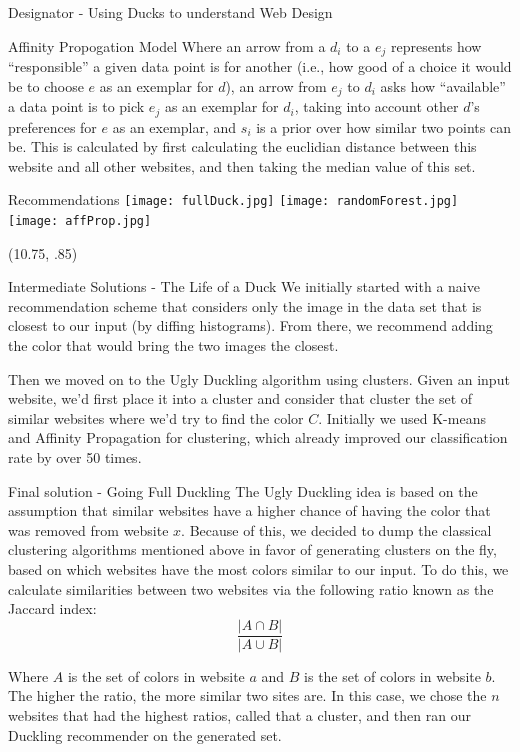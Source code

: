 \documentclass{beamer}
\begin{document}
\begin{frame}{\centerline{\Huge Designator - Using Ducks to understand Web Design}}
\begin{textblock}{5}
\begin{block}{Affinity Propogation Model}
Where an arrow from a $d_i$ to a $e_j$ represents how ``responsible'' a given data point is for another (i.e., how good of a choice it would be to choose $e$ as an exemplar for $d$), an arrow from $e_j$ to $d_i$ asks how ``available'' a data point is to pick $e_j$ as an exemplar for $d_i$, taking into account other $d$'s preferences for $e$ as an exemplar, and $s_i$ is a prior over how similar two points can be. This is calculated by first calculating the euclidian distance between this website and all other websites, and then taking the median value of this set.
\end{block}
\begin{block}{Recommendations}
\texttt{[image: fullDuck.jpg]}
\texttt{[image: randomForest.jpg]}
\texttt{[image: affProp.jpg]}


\end{block}
\end{textblock}

\begin{textblock}{5}(10.75, .85)
\begin{block}{Intermediate Solutions - The Life of a Duck}
We initially started with a naive recommendation scheme that considers only the image in the data set that is closest to our input (by diffing
histograms). From there, we recommend adding the color that would bring the two images the
closest.

Then we moved on to the Ugly Duckling algorithm using clusters. Given an input website, we'd first place it into a
cluster and consider that cluster the set of similar websites where we'd try to find the color $C$. Initially we used K-means and
Affinity Propagation for clustering, which already improved our classification rate by over 50 times.
\end{block}

\begin{block}{Final solution - Going Full Duckling}
The Ugly Duckling idea is based on the assumption that similar websites have a higher chance of having the color that
was removed from website $x$. Because of this, we decided to dump the classical clustering algorithms mentioned above in favor of
generating clusters on the fly, based on which websites have the most colors similar to our input. To do this, we
calculate similarities between two websites via the following ratio known as the Jaccard index:
$$\frac{|A \cap B|}{|A \cup B|}$$

Where $A$ is the set of colors in website $a$ and $B$ is the set of colors in website $b$. The higher the ratio, the
more similar two sites are. In this case, we chose the $n$ websites that had the highest ratios, called that a cluster,
and then ran our Duckling recommender on the generated set.


\end{block}
\end{textblock}
\end{frame}
\end{document}
